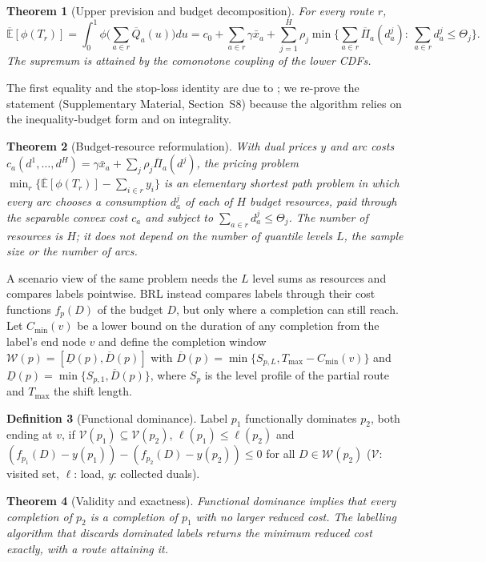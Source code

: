 \documentclass[preprint,11pt]{elsarticle}
\newtheorem{theorem}{Theorem}
\theoremstyle{definition}
\newtheorem{definition}[theorem]{Definition}
\theoremstyle{remark}
\newcommand{\Eu}{\overline{\mathbb{E}}}
\newcommand{\Qb}{\overline{Q}}
\newcommand{\Pib}{\overline{\Pi}}
\newcommand{\xb}{\bar x}
\newcommand{\Dl}{\underline{D}}
\newcommand{\Dh}{\overline{D}}
\newcommand{\SM}[1]{Supplementary Material, Section~#1}
\begin{document}
\begin{theorem}[Upper prevision and budget decomposition]\label{thm:brl-main}
For every route $r$,
\[
\Eu[\phi(T_r)]=\int_0^1\phi\Big(\sum_{a\in r}\Qb_a(u)\Big)du
=c_0+\sum_{a\in r}\gamma\xb_a+\sum_{j=1}^{H}\rho_j\min\Big\{\sum_{a\in r}\Pib_a(d^j_a):\ \sum_{a\in r}d^j_a\le\Theta_j\Big\}.
\]
The supremum is attained by the comonotone coupling of the lower CDFs.
\end{theorem}
The first equality and the stop-loss identity are due to \citet{Meilijson1979}; we re-prove the statement (\SM{S8}) because the algorithm relies on the inequality-budget form and on integrality.

\begin{theorem}[Budget-resource reformulation]\label{thm:resource}
With dual prices $y$ and arc costs $c_a(d^1,\dots,d^H)=\gamma\xb_a+\sum_j\rho_j\Pib_a(d^j)$, the pricing problem $\min_{r}\{\Eu[\phi(T_r)]-\sum_{i\in r}y_i\}$ is an elementary shortest path problem in which every arc chooses a consumption $d^j_a$ of each of $H$ budget resources, paid through the separable convex cost $c_a$ and subject to $\sum_{a\in r}d^j_a\le\Theta_j$. The number of resources is $H$; it does not depend on the number of quantile levels $L$, the sample size or the number of arcs.
\end{theorem}

A scenario view of the same problem needs the $L$ level sums as resources and compares labels pointwise. BRL instead compares labels through their cost functions $f_p(D)$ of the budget $D$, but only where a completion can still reach. Let $C_{\min}(v)$ be a lower bound on the duration of any completion from the label's end node $v$ and define the completion window $\mathcal W(p)=[\Dl(p),\Dh(p)]$ with $\Dh(p)=\min\{S_{p,L},T_{\max}-C_{\min}(v)\}$ and $\Dl(p)=\min\{S_{p,1},\Dh(p)\}$, where $S_p$ is the level profile of the partial route and $T_{\max}$ the shift length.

\begin{definition}[Functional dominance]\label{def:fdom}
Label $p_1$ functionally dominates $p_2$, both ending at $v$, if $\mathcal V(p_1)\subseteq\mathcal V(p_2)$, $\ell(p_1)\le\ell(p_2)$ and $(f_{p_1}(D)-y(p_1))-(f_{p_2}(D)-y(p_2))\le0$ for all $D\in\mathcal W(p_2)$ ($\mathcal V$: visited set, $\ell$: load, $y$: collected duals).
\end{definition}

\begin{theorem}[Validity and exactness]\label{thm:fdom}
Functional dominance implies that every completion of $p_2$ is a completion of $p_1$ with no larger reduced cost. The labelling algorithm that discards dominated labels returns the minimum reduced cost exactly, with a route attaining it.
\end{theorem}
\end{document}

